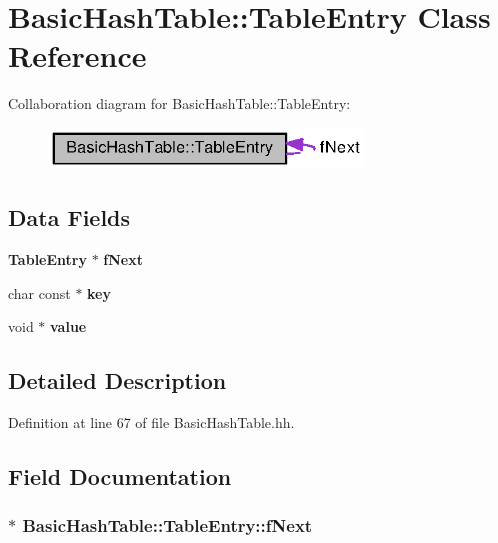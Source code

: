 \section{Basic\+Hash\+Table\+:\+:Table\+Entry Class Reference}
\label{classBasicHashTable_1_1TableEntry}


Collaboration diagram for Basic\+Hash\+Table\+:\+:Table\+Entry\+:
\nopagebreak
\begin{figure}[H]
\begin{center}
\leavevmode
\includegraphics[width=237pt]{classBasicHashTable_1_1TableEntry__coll__graph}
\end{center}
\end{figure}
\subsection*{Data Fields}
\begin{DoxyCompactItemize}
\item 
{\bf Table\+Entry} $\ast$ {\bf f\+Next}
\item 
char const $\ast$ {\bf key}
\item 
void $\ast$ {\bf value}
\end{DoxyCompactItemize}


\subsection{Detailed Description}


Definition at line 67 of file Basic\+Hash\+Table.\+hh.



\subsection{Field Documentation}
\subsubsection[{f\+Next}]{$\ast$ Basic\+Hash\+Table\+::\+Table\+Entry\+::f\+Next}\label{classBasicHashTable_1_1TableEntry_a6e16e21c29b6039605c7860985a5d763}


